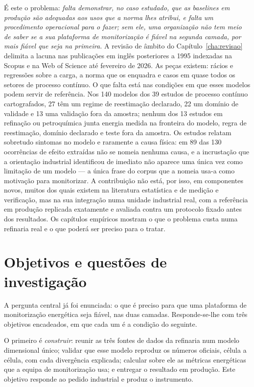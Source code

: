 É este o problema: \emph{falta demonstrar, no caso estudado, que as
\emph{baselines} em produção são adequadas aos usos que a norma lhes
atribui, e falta um procedimento operacional para o fazer; sem ele, uma
organização não tem meio de saber se a sua plataforma de monitorização é
fiável na segunda camada, por mais fiável que seja na primeira.} A
revisão de âmbito do Capítulo~\ref{cha:revisao} delimita a lacuna nas
publicações em inglês posteriores a 1995 indexadas na Scopus e na Web of
Science até fevereiro de 2026. As peças existem: rácios e regressões sobre a
carga, a norma que os enquadra e casos em quase todos os setores de processo
contínuo. O que falta está nas condições em que esses modelos podem servir
de referência. Nos 140 modelos dos 39 estudos de processo contínuo
cartografados, 27 têm um regime de reestimação declarado, 22 um domínio de
validade e 13 uma validação fora da amostra; nenhum dos 13 estudos em
refinação ou petroquímica junta energia medida na fronteira do modelo,
regra de reestimação, domínio declarado e teste fora da amostra. Os estudos
relatam sobretudo sintomas no modelo e raramente a causa física: em 89 das
130 ocorrências de efeito extraídas não se nomeia nenhuma causa, e a
incrustação que a orientação industrial identificou de imediato não aparece
uma única vez como limitação de um modelo --- a única frase do corpus que a
nomeia usa-a como motivação para monitorizar. A contribuição não está, por isso,
em componentes novos, muitos dos quais existem na literatura estatística e
de medição e verificação, mas na sua integração numa unidade industrial
real, com a referência em produção replicada exatamente e avaliada contra um
protocolo fixado antes dos resultados. Os capítulos empíricos mostram o que
o problema custa numa refinaria real e o que poderá ser preciso para o tratar.

\section{Objetivos e questões de investigação}
\label{sec:objetivos}

A pergunta central já foi enunciada: o que é preciso para que uma
plataforma de monitorização energética seja fiável, nas duas camadas.
Responde-se-lhe com três objetivos encadeados, em que cada um é a
condição do seguinte.

O primeiro é \emph{construir}: reunir as três fontes de dados da
refinaria num modelo dimensional único; validar que esse modelo
reproduz os números oficiais, célula a célula, com cada divergência
explicada; calcular sobre ele as métricas energéticas que a equipa de
monitorização usa; e entregar o resultado em produção. Este objetivo
responde ao pedido industrial e produz o instrumento.

